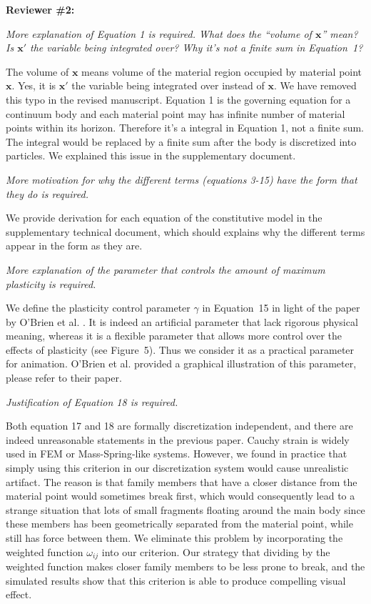 \noindent{}\textbf{Reviewer \#2:}

\emph{More explanation of Equation 1 is required. What does the ``volume of $\mathbf{x}$'' mean? Is $\mathbf{x}'$ the variable being integrated over? Why it's not a finite sum in Equation~1?}

The volume of $\mathbf{x}$ means volume of the material region occupied by material point $\mathbf{x}$. Yes, it is $\mathbf{x}'$ the variable being integrated over instead of $\mathbf{x}$. We have removed this typo in the revised manuscript. Equation 1 is the governing equation for a continuum body and each material point may has infinite number of material points within its horizon. Therefore it's a integral in Equation 1, not a finite sum. The integral would be replaced by a finite sum after the body is discretized into particles. We explained this issue in the supplementary document.

\emph{More motivation for why the different terms (equations 3-15) have the form that they do is required.}

We provide derivation for each equation of the constitutive model in the supplementary technical document, which should explains why the different terms appear in the form as they are.

\emph{More explanation of the parameter that controls the amount of maximum plasticity is required.}

We define the plasticity control parameter $\gamma$ in Equation~15 in light of the paper by O'Brien et al. \cite{O'Brien:2002:GMA:566654.566579}. It is indeed an artificial parameter that lack rigorous physical meaning, whereas it is a flexible parameter that allows more control over the effects of plasticity (see Figure~5). Thus we consider it as a practical parameter for animation. O'Brien et al. \cite{O'Brien:2002:GMA:566654.566579} provided a graphical illustration of this parameter, please refer to their paper.

\emph{Justification of Equation 18 is required.}

Both equation 17 and 18 are formally discretization independent, and there are indeed unreasonable statements in the previous paper.
Cauchy strain is widely used in FEM or Mass-Spring-like systems.
However, we found in practice that simply using this criterion in our discretization system would cause unrealistic artifact. 
The reason is that family members that have a closer distance from the material point would sometimes break first,
which would consequently lead to a strange situation that lots of small fragments floating around the main body 
since these members has been geometrically separated from the material point, while still has force between them.
We eliminate this problem by incorporating the weighted function $\omega_{ij}$ into our criterion.
Our strategy that dividing by the weighted function makes closer family members to be less prone to break,
and the simulated results show that this criterion is able to produce compelling visual effect.

